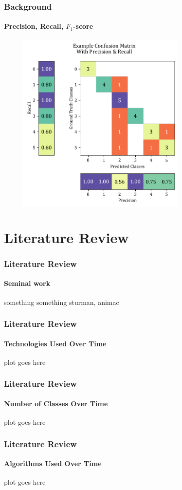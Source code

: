 \documentclass[xcolor={svgnames,table},10pt,fleqn]{beamer}
\begin{document}
\begin{frame}
    \frametitle{Background}
    \framesubtitle{Precision, Recall, $F_1$-score}
    \begin{figure}
        \includegraphics[width=0.75\textwidth]{imgs/conf_mat_prec_recall.pdf}
    \end{figure}
\end{frame}


\section{Literature Review}
\begin{frame}
    \frametitle{Literature Review}
    \framesubtitle{Seminal work}
    something something sturman, animac
\end{frame}

\begin{frame}
    \frametitle{Literature Review}
    \framesubtitle{Technologies Used Over Time}
    plot goes here
\end{frame}

\begin{frame}
    \frametitle{Literature Review}
    \framesubtitle{Number of Classes Over Time}
    plot goes here
\end{frame}

\begin{frame}
    \frametitle{Literature Review}
    \framesubtitle{Algorithms Used Over Time}
    plot goes here
\end{frame}
\end{document}
